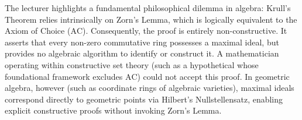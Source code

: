 \begin{content}
\begin{center}
\end{center}
\end{content}

\begin{insight}
The lecturer highlights a fundamental philosophical dilemma in algebra: Krull's Theorem relies intrinsically on Zorn's Lemma, which is logically equivalent to the Axiom of Choice ($\text{AC}$). Consequently, the proof is entirely non-constructive. It asserts that every non-zero commutative ring possesses a maximal ideal, but provides no algebraic algorithm to identify or construct it. A mathematician operating within constructive set theory (such as a hypothetical  whose foundational framework excludes $\text{AC}$) could not accept this proof. In geometric algebra, however (such as coordinate rings of algebraic varieties), maximal ideals correspond directly to geometric points via Hilbert's Nullstellensatz, enabling explicit constructive proofs without invoking Zorn's Lemma.
\end{insight}

